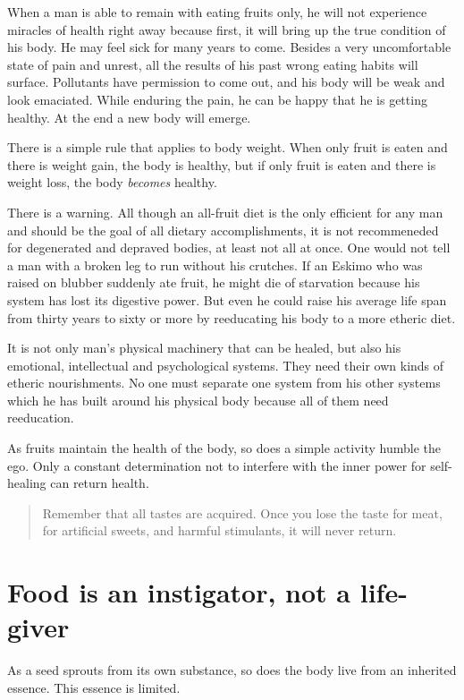 \documentclass[landscape,twocolumn,letterpaper]{article}
\begin{document}
When a man is able to remain with eating fruits only, he will not
experience miracles of health right away because first, it will bring
up the true condition of his body. He may feel sick for many years to
come. Besides a very uncomfortable state of pain and unrest, all the
results of his past wrong eating habits will surface. Pollutants have
permission to come out, and his body will be weak and look
emaciated. While enduring the pain, he can be happy that he is getting
healthy. At the end a new body will emerge.

There is a simple rule that applies to body weight. When only fruit is
eaten and there is weight gain, the body is healthy, but if only fruit
is eaten and there is weight loss, the body \emph{becomes} healthy.

There is a warning. All though an all-fruit diet is the only efficient
for any man and should be the goal of all dietary accomplishments, it
is not recommeneded for degenerated and depraved bodies, at least not
all at once.  One would not tell a man with a broken leg to run
without his crutches. If an Eskimo who was raised on blubber suddenly
ate fruit, he might die of starvation because his system has lost its
digestive power. But even he could raise his average life span from
thirty years to sixty or more by reeducating his body to a more
etheric diet.

It is not only man's physical machinery that can be healed, but also
his emotional, intellectual and psychological systems. They need their
own kinds of etheric nourishments. No one must separate one system from
his other systems which he has built around his physical body because
all of them need reeducation.

As fruits maintain the health of the body, so does a simple activity
humble the ego. Only a constant determination not to interfere with
the inner power for self-healing can return health.

\begin{quotation} Remember that all tastes are acquired. Once you lose
the taste for meat, for artificial sweets, and harmful stimulants, it
will never return.
\end{quotation}
\section{Food is an instigator, not a life-giver}

As a seed sprouts from its own substance, so does the body live from
an inherited essence. This essence is limited.
\end{document}
